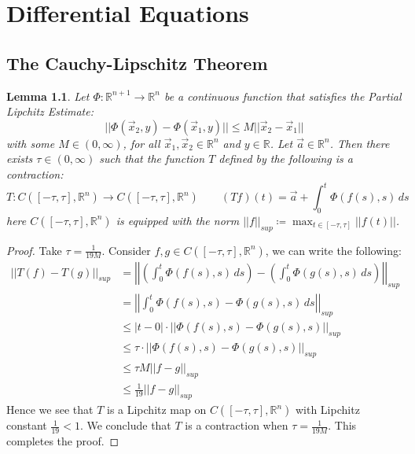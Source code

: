 \documentclass[15pt]{book}
\theoremstyle{break}
\theoremstyle{break}
\newtheorem{lem}{Lemma}[thm]
\newcommand{\R}{\mathbb{R}}
\newcommand{\Complex}{\mathbb{C}}
\begin{document}








\newpage
\chapter{Differential Equations}
\setcounter{section}{33}
\section[The Cauchy-Lipschitz Theorem]{\color{red}The Cauchy-Lipschitz Theorem\color{black}}
\begin{lem}
Let $\Phi:\R^{n+1} \to \R^n$ be a continuous function that satisfies the Partial Lipchitz Estimate:
$$||\Phi(\vec{x}_2, y) - \Phi(\vec{x}_1,y)|| \leq M||\vec{x}_2-\vec{x}_1||$$
with some $M\in (0,\infty)$, for all $\vec{x}_1,\vec{x}_2 \in \R^n$ and $y \in \R$. Let $\vec{a}\in \R^n$. Then there exists $\tau \in (0,\infty)$ such that the function $T$ defined by the following is a contraction: $$T:C([-\tau,\tau],\R^n) \to C([-\tau,\tau],\R^n)\qquad(Tf)(t)= \vec{a}+\int_0^t\Phi(f(s),s)\, ds$$ here $C([-\tau,\tau],\R^n)$ is equipped with the norm $||f||_{sup} \coloneqq \max_{t\in [-\tau,\tau]} ||f(t)||$.
\end{lem}

\begin{proof}
Take $\tau = \frac{1}{19M}$. Consider $f,g \in C([-\tau,\tau],\R^n)$, we can write the following:
\begin{align*}
||T(f) - T(g)||_{sup} 
&= \left|\left|\left(\int_{0}^t \Phi(f(s),s)\,ds \right)-\left(\int_{0}^t \Phi(g(s),s)\,ds \right) \right|\right|_{sup} \\
&= \left|\left|\int_{0}^t \Phi(f(s),s)- \Phi(g(s),s)\,ds  \right|\right|_{sup} \\
&\leq |t-0|\cdot \left|\left|\Phi(f(s),s)- \Phi(g(s),s) \right|\right|_{sup} \\
&\leq \tau\cdot \left|\left|\Phi(f(s),s)- \Phi(g(s),s) \right|\right|_{sup} \\
&\leq \tau M ||f-g||_{sup} \\
&\leq \frac{1}{19} ||f-g||_{sup}
\end{align*}
Hence we see that $T$ is a Lipchitz map on $C([-\tau,\tau],\R^n)$ with Lipchitz constant $\frac{1}{19}< 1$. We conclude that $T$ is a contraction when $\tau = \frac{1}{19M}$. This completes the proof.
\end{proof}
\end{document}
